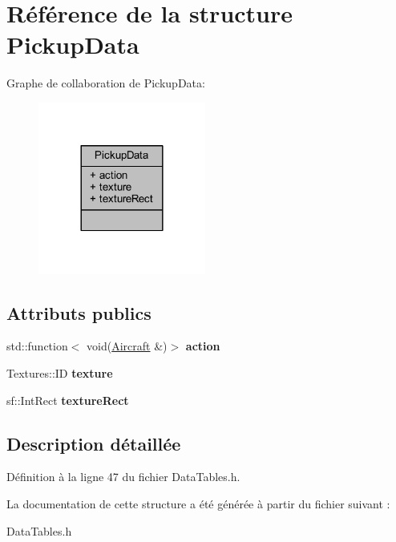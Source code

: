 \hypertarget{struct_pickup_data}{}\section{Référence de la structure Pickup\+Data}
\label{struct_pickup_data}


Graphe de collaboration de Pickup\+Data\+:\nopagebreak
\begin{figure}[H]
\begin{center}
\leavevmode
\includegraphics[width=156pt]{struct_pickup_data__coll__graph}
\end{center}
\end{figure}
\subsection*{Attributs publics}
\begin{DoxyCompactItemize}
\item 
\hypertarget{struct_pickup_data_ac0b50e1f92914cb84fcb612b83bed6ae}{}\label{struct_pickup_data_ac0b50e1f92914cb84fcb612b83bed6ae} 
std\+::function$<$ void(\hyperlink{class_aircraft}{Aircraft} \&)$>$ {\bfseries action}
\item 
\hypertarget{struct_pickup_data_a3e48147f1441e4c10e7c0b6a9393a0bc}{}\label{struct_pickup_data_a3e48147f1441e4c10e7c0b6a9393a0bc} 
Textures\+::\+ID {\bfseries texture}
\item 
\hypertarget{struct_pickup_data_a7e6288e6d9e8267d35b2d446dc8d58d3}{}\label{struct_pickup_data_a7e6288e6d9e8267d35b2d446dc8d58d3} 
sf\+::\+Int\+Rect {\bfseries texture\+Rect}
\end{DoxyCompactItemize}


\subsection{Description détaillée}


Définition à la ligne 47 du fichier Data\+Tables.\+h.



La documentation de cette structure a été générée à partir du fichier suivant \+:\begin{DoxyCompactItemize}
\item 
Data\+Tables.\+h\end{DoxyCompactItemize}

